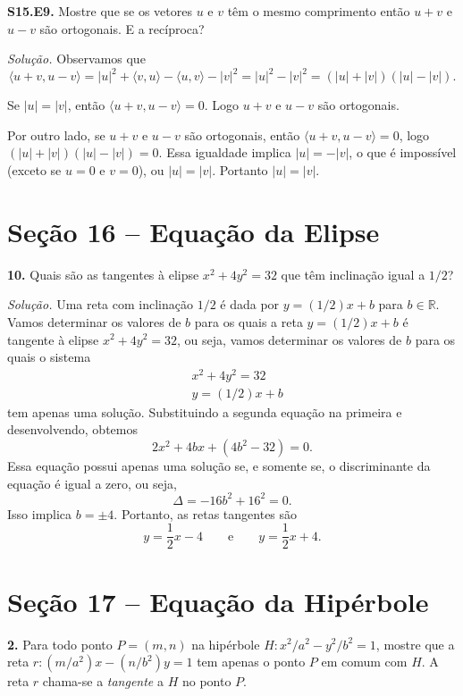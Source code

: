 \documentclass[a4paper,11pt]{article}
\newcommand{\R}{\mathbb{R}}
\begin{document}
\textbf{S15.E9.}
Mostre que se os vetores $u$ e $v$ têm o mesmo comprimento então $u + v$ e $u - v$ são ortogonais.
E a recíproca?

\vspace{\baselineskip}

\emph{Solução.}
Observamos que
\[
  \langle u + v, u - v \rangle = |u|^2 + \langle v, u \rangle - \langle u, v \rangle - |v|^2 = |u|^2 - |v|^2 = (|u| + |v|)(|u| - |v|).
\]

Se $|u| = |v|$, então $\langle u + v, u - v \rangle = 0$.
Logo $u + v$ e $u - v$ são ortogonais.

Por outro lado, se $u + v$ e $u - v$ são ortogonais, então $\langle u + v, u - v \rangle = 0$, logo $(|u|+|v|)(|u|-|v|) = 0$.
Essa igualdade implica $|u| = -|v|$, o que é impossível (exceto se $u = 0$ e $v = 0$), ou $|u| = |v|$.
Portanto $|u| = |v|$.

\section*{Seção 16 -- Equação da Elipse}

\textbf{10.}
Quais são as tangentes à elipse $x^2 + 4y^2 = 32$ que têm inclinação igual a $1/2$?

\vspace{\baselineskip}

\emph{Solução.}
Uma reta com inclinação $1/2$ é dada por $y = (1/2)x + b$ para $b \in \R$.
Vamos determinar os valores de $b$ para os quais a reta $y = (1/2)x + b$ é tangente à elipse $x^2 + 4y^2 = 32$, ou seja, vamos determinar os valores de $b$ para os quais o sistema
\begin{align*}
  & x^2 + 4y^2 = 32 \\
  & y = (1/2)x + b
\end{align*}
tem apenas uma solução.
Substituindo a segunda equação na primeira e desenvolvendo, obtemos
\[
  2x^2 + 4bx + (4b^2 - 32) = 0.
\]
Essa equação possui apenas uma solução se, e somente se, o discriminante da equação é igual a zero, ou seja,
\[
  \Delta = -16b^2 + 16^2 = 0.
\]
Isso implica $b = \pm 4$.
Portanto, as retas tangentes são
\[
  y = \frac{1}{2} x - 4 \qquad \text{e} \qquad y = \frac{1}{2} x + 4.
\]

\section*{Seção 17 -- Equação da Hipérbole}

\textbf{2.}
Para todo ponto $P = (m,n)$ na hipérbole $H : x^2/a^2 - y^2/b^2 = 1$, mostre que a reta $r: (m/a^2)x - (n/b^2)y = 1$ tem apenas o ponto $P$ em comum com $H$.
A reta $r$ chama-se a \emph{tangente} a $H$ no ponto $P$.
\end{document}
